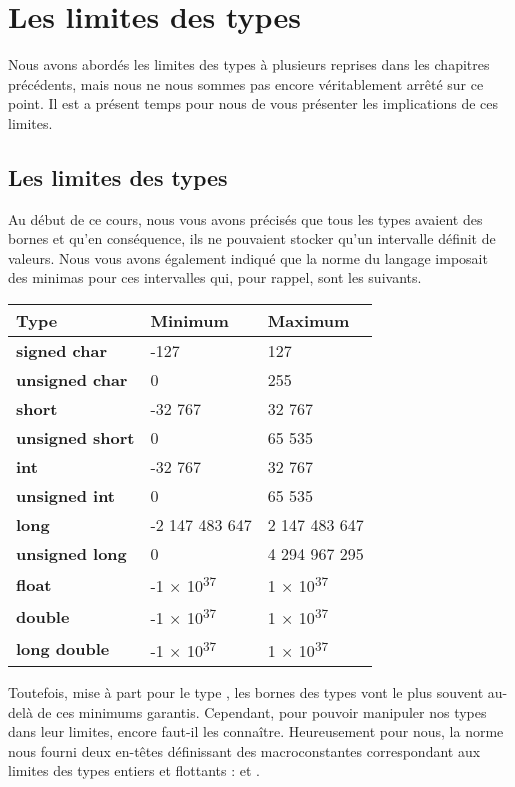 \chapter{Les limites des types}
\label{les-limites-des-types-1}

Nous avons abordés les limites des types à plusieurs reprises dans les
chapitres précédents, mais nous ne nous sommes pas encore véritablement
arrêté sur ce point. Il est a présent temps pour nous de vous présenter
les implications de ces limites.

\section{Les limites des types}
\label{les-limites-des-types-2}

Au début de ce cours, nous vous avons précisés que tous les types 
avaient des bornes et qu'en conséquence, ils ne pouvaient stocker 
qu'un intervalle définit de valeurs. Nous vous avons également 
indiqué que la norme du langage imposait des minimas pour ces 
intervalles qui, pour rappel, sont les suivants.

\begin{table}
\centering
{}
\begin{tabular}{|l|l|l|}\hline
\rowcolor{gris-tab-entete}\bf 
Type & Minimum & Maximum\tabularnewline\hline
\textbf{signed char} & -127 & 127\tabularnewline\hline
\textbf{unsigned char} & 0 & 255\tabularnewline\hline
\textbf{short} & -32 767 & 32 767\tabularnewline\hline
\textbf{unsigned short} & 0 & 65 535\tabularnewline\hline
\textbf{int} & -32 767 & 32 767\tabularnewline\hline
\textbf{unsigned int} & 0 & 65 535\tabularnewline\hline
\textbf{long} & -2 147 483 647 & 2 147 483 647\tabularnewline\hline
\textbf{unsigned long} & 0 & 4 294 967 295\tabularnewline\hline
\textbf{float} & -1 × 10\textsuperscript{37} & 1 ×
10\textsuperscript{37}\tabularnewline\hline
\textbf{double} & -1 × 10\textsuperscript{37} & 1 ×
10\textsuperscript{37}\tabularnewline\hline
\textbf{long double} & -1 × 10\textsuperscript{37} & 1 ×
10\textsuperscript{37}\tabularnewline\hline
\end{tabular}
\end{table}

Toutefois, mise à part pour le type , les bornes des types
vont le plus souvent au-delà de ces minimums garantis. Cependant, pour
pouvoir manipuler nos types dans leur limites, encore faut-il les
connaître. Heureusement pour nous, la norme nous fourni deux en-têtes
définissant des macroconstantes correspondant aux limites des types
entiers et flottants :  et
.

